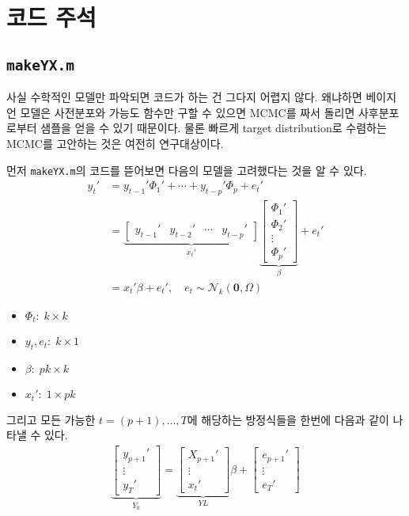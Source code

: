 \documentclass{article}
\begin{document}
\newpage
\section{코드 주석}
\subsection{\texttt{makeYX.m}}
  사실 수학적인 모델만 파악되면 코드가 하는 건 그다지 어렵지 않다. 왜냐하면 베이지언 모델은 사전분포와 가능도 함수만 구할 수 있으면 MCMC를 짜서 돌리면 사후분포로부터 샘플을 얻을 수 있기 때문이다. 물론 빠르게 target distribution로 수렴하는 MCMC를 고안하는 것은 여전히 연구대상이다.\par
  먼저 \texttt{makeYX.m}의 코드를 뜯어보면 다음의 모델을 고려했다는 것을 알 수 있다.
  \begin{align}
    y_{t}' &= y_{t-1}'\Phi_{1}'+\cdots +y_{t-p}'\Phi_{p}+e_{t}'\\
    &= \underbrace{\begin{bmatrix}y_{t-1}'& y_{t-2}' & \cdots & y_{t-p}' \end{bmatrix}}_{x_{t}'}\underbrace{\begin{bmatrix}\Phi_{1}'\\ \Phi_{2}'\\ \vdots \\ \Phi_{p}' \end{bmatrix}}_{\beta}+e_{t}'\\
    &= x_{t}'\beta + e_{t}',\quad e_{t}\sim \mathcal{N}_{k}\left(\mathbf{0},\Omega\right)
  \end{align}
  \begin{itemize}
    \item $\Phi_{t}:\; k\times k$
    \item $y_{t},e_{t}:\; k\times 1$
    \item $\beta: \; pk\times k$
    \item $x_{t}':\; 1\times pk$
  \end{itemize}
  그리고 모든 가능한 $t = (p+1),\ldots, T$에 해당하는 방정식들을 한번에 다음과 같이 나타낼 수 있다.
  \begin{align}
    \underbrace{\begin{bmatrix}y_{p+1}'\\ \vdots \\ y_{T}'  \end{bmatrix}}_{Y_{0}} = \underbrace{\begin{bmatrix}X_{p+1}'\\ \vdots \\ x_{t}' \end{bmatrix}}_{YL}\beta + \begin{bmatrix}e_{p+1}'\\ \vdots \\ e_{T}' \end{bmatrix}
  \end{align}
\end{document}
